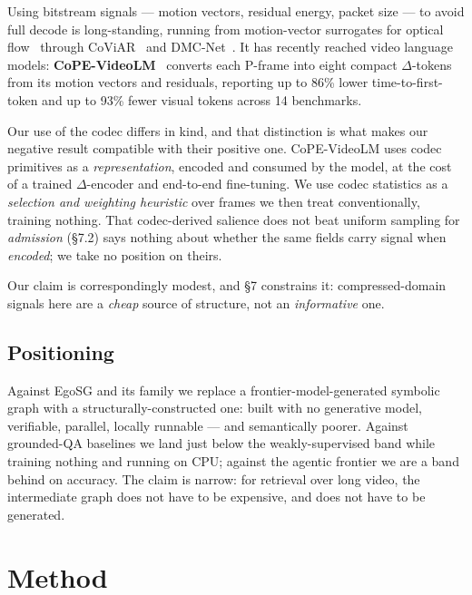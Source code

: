 \documentclass[sigconf,review,anonymous]{acmart}
\begin{document}
Using bitstream signals --- motion vectors, residual energy, packet size --- to avoid full decode
is long-standing, running from motion-vector surrogates for optical flow~\cite{zhang2016mvcnn}
through CoViAR~\cite{wu2018coviar} and DMC-Net~\cite{shou2019dmcnet}. It has recently reached video language models:
\textbf{CoPE-VideoLM}~\cite{sarkar2026cope} converts each P-frame into eight compact \ensuremath{\Delta}-tokens from
its motion vectors and residuals, reporting up to 86\% lower time-to-first-token and up to 93\%
fewer visual tokens across 14 benchmarks.

Our use of the codec differs in kind, and that distinction is what makes our negative result
compatible with their positive one. CoPE-VideoLM uses codec primitives as a \emph{representation},
encoded and consumed by the model, at the cost of a trained \ensuremath{\Delta}-encoder and end-to-end
fine-tuning. We use codec statistics as a \emph{selection and weighting heuristic} over frames we
then treat conventionally, training nothing. That codec-derived salience does not beat
uniform sampling for \emph{admission} (§7.2) says nothing about whether the same fields carry
signal when \emph{encoded}; we take no position on theirs.

Our claim is correspondingly modest, and §7 constrains it: compressed-domain signals here
are a \emph{cheap} source of structure, not an \emph{informative} one.

\subsection{Positioning}

Against EgoSG and its family we replace a frontier-model-generated symbolic graph with a
structurally-constructed one: built with no generative model, verifiable, parallel, locally
runnable --- and semantically poorer. Against grounded-QA baselines we land just below the weakly-supervised band
while training nothing and running on CPU; against the agentic frontier we are a band behind
on accuracy. The claim is narrow: for
retrieval over long video, the intermediate graph does not have to be expensive, and does not
have to be generated.

\section{Method}
\end{document}
